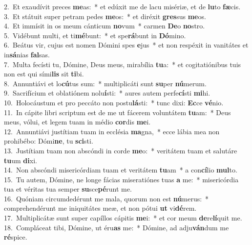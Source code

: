 {2.~}Et exaudívit preces \textbf{me}as:~* et edúxit me de lacu misériæ, et de \textbf{lu}to \textbf{fæ}cis.\\
{3.~}Et státuit super petram pedes \textbf{me}os:~* et diréxit \textbf{gres}sus \textbf{me}os.\\
{4.~}Et immísit in os meum cánticum \textbf{no}vum~* carmen \textbf{De}o \textbf{no}stro.\\
{5.~}Vidébunt multi, et ti\textbf{mé}bunt:~* et spe\textbf{rá}bunt in \textbf{Dó}mino.\\
{6.~}Beátus vir, cujus est nomen Dómini spes \textbf{e}jus~* et non respéxit in vanitátes et in\textbf{sá}nias \textbf{fal}sas.\\
{7.~}Multa fecísti tu, Dómine, Deus meus, mirabília \textbf{tu}a:~* et cogitatiónibus tuis non est qui sími\textbf{lis} sit \textbf{ti}bi.\\
{8.~}Annuntiávi et lo\textbf{cú}tus sum:~* multiplicáti sunt \textbf{su}per \textbf{nú}merum.\\
{9.~}Sacrifícium et oblatiónem nolu\textbf{í}sti:~* aures autem perfe\textbf{cí}sti \textbf{mi}hi.\\
{10.~}Holocáustum et pro peccáto non postu\textbf{lá}sti:~* tunc dixi: \textbf{Ec}ce \textbf{vé}nio.\\
{11.~}In cápite libri scriptum est de me ut fácerem voluntátem \textbf{tu}am:~* Deus meus, vólui, et legem tuam in médio \textbf{cor}dis \textbf{me}i.\\
{12.~}Annuntiávi justítiam tuam in ecclésia \textbf{ma}gna,~* ecce lábia mea non prohibébo: Dómi\textbf{ne}, tu \textbf{sci}sti.\\
{13.~}Justítiam tuam non abscóndi in corde \textbf{me}o:~* veritátem tuam et salutáre \textbf{tu}um \textbf{di}xi.\\
{14.~}Non abscóndi misericórdiam tuam et veritátem \textbf{tu}am~* a con\textbf{cí}lio \textbf{mul}to.\\
{15.~}Tu autem, Dómine, ne longe fácias miseratiónes tuas \textbf{a} me:~* misericórdia tua et véritas tua semper \textbf{su}sce\textbf{pé}runt me.\\
{16.~}Quóniam circumdedérunt me mala, quorum non est \textbf{nú}merus:~* comprehendérunt me iniquitátes meæ, et non pótui \textbf{ut} vi\textbf{dé}rem.\\
{17.~}Multiplicátæ sunt super capíllos cápitis \textbf{me}i:~* et cor meum \textbf{de}re\textbf{lí}quit me.\\
{18.~}Compláceat tibi, Dómine, ut éru\textbf{as} me:~* Dómine, ad adju\textbf{ván}dum me \textbf{ré}spice.\\
